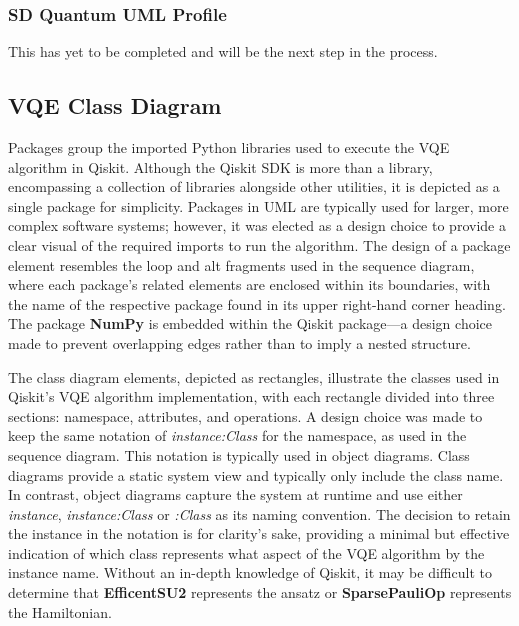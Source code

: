 \documentclass{article}
\begin{document}
{\subsubsection{SD Quantum UML Profile}

This has yet to be completed and will be the next step in the process.

\subsection{VQE Class Diagram}

Packages group the imported Python libraries used to execute the VQE algorithm in Qiskit. Although the Qiskit SDK is more than a library, encompassing a collection of libraries alongside other utilities\cite{SheriefAbul-Ezz}, it is depicted as a single package for simplicity. Packages in UML are typically used for larger, more complex software systems\cite{VisualParadigm}; however, it was elected as a design choice to provide a clear visual of the required imports to run the algorithm. The design of a package element resembles the loop and alt fragments used in the sequence diagram, where each package's related elements are enclosed within its boundaries, with the name of the respective package found in its upper right-hand corner heading. The package \textbf{NumPy} is embedded within the Qiskit package—a design choice made to prevent overlapping edges rather than to imply a nested structure.

The class diagram elements, depicted as rectangles, illustrate the classes used in Qiskit’s VQE algorithm implementation, with each rectangle divided into three sections: namespace, attributes, and operations. A design choice was made to keep the same notation of \textit{instance:Class} for the namespace, as used in the sequence diagram. This notation is typically used in object diagrams. Class diagrams provide a static system view and typically only include the class name. In contrast, object diagrams capture the system at runtime and use either \textit{instance}, \textit{instance:Class} or \textit{:Class} as its naming convention\cite{Seidl_Scholz_Huemer_Kappel_Duffy_2014}. The decision to retain the instance in the notation is for clarity's sake, providing a minimal but effective indication of which class represents what aspect of the VQE algorithm by the instance name. Without an in-depth knowledge of Qiskit, it may be difficult to determine that \textbf{EfficentSU2} represents the ansatz or \textbf{SparsePauliOp} represents the Hamiltonian.

}
\end{document}
